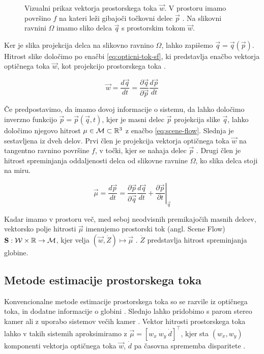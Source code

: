 \begin{figure}
\centering

\caption[Vizualni prikaz vektorja prostorskega toka $\vec{w}$]{Vizualni prikaz vektorja prostorskega toka $\vec{w}$. V prostoru imamo površino $f$ na kateri leži gibajoči točkovni delec $\vec{p}$ \cite{vedula1999three}. Na slikovni ravnini $\mathit{\Omega}$ imamo sliko delca $\vec{q}$ s prostorskim tokom $\vec{w}$.}
\label{fig:scene-flow}
\end{figure}



Ker je slika projekcija delca na slikovno ravnino $\mathit{\Omega}$, lahko zapišemo $\vec{q} = \vec{q}(\vec{p})$. Hitrost slike določimo po enačbi \eqref{eq:opticni-tok-sf}, ki predstavlja enačbo vektorja optičnega toka $\vec{w}$, kot projekcijo prostorskega toka \cite{vedula1999three}. 


\begin{equation}\label{eq:opticni-tok-sf}
	\vec{w} = \frac{d\vec{q}}{dt} = \frac{\partial \vec{q}}{\partial \vec{p}}\frac{d\vec{p}}{dt}
\end{equation}

Če predpostavimo, da imamo dovoj informacije o sistemu, da lahko določimo inverzno funkcijo $\vec{p} = \vec{p}(\vec{q},t)$, kjer je masni delec $\vec{p}$ projekcija slike $\vec{q}$, lahko določimo njegovo hitrost $\mathbf{\mu} \in \mathcal{M} \subset \mathbb{R}^3$ z enačbo \eqref{eq:scene-flow}. Slednja je sestavljena iz dveh delov. Prvi člen je projekcija vektorja optičnega toka $\vec{w}$ na tangentno ravnino površine $f$, v točki, kjer se nahaja delec $\vec{p}$ \cite{vedula1999three}. Drugi člen je hitrost spreminjanja oddaljenosti delca od slikovne ravnine $\mathit{\Omega}$, ko slika delca stoji na miru. 

\begin{equation}\label{eq:scene-flow}
	\vec{\mu} = \frac{d\vec{p}}{dt} = \frac{\partial \vec{p}}{\partial \vec{q}} \frac{d\vec{q}}{dt} + \left.\frac{\partial \vec{p}}{\partial t}\right|_\vec{q}
\end{equation}

Kadar imamo v prostoru več, med seboj neodvisnih premikajočih masnih delcev, vektorsko polje hitrosti $\vec{\mu}$ imenujemo prostorski tok (angl. Scene Flow) $\mathbf{S}: \mathcal{W} \times \mathbb{R} \to \mathcal{M}$, kjer velja $(\vec{w}, \dot{Z}) \mapsto \vec{\mu}$ \cite{yan2016scene}. $\dot{Z}$ predstavlja hitrost spreminjanja globine.

\subsection{Metode estimacije prostorskega toka}
Konvencionalne metode estimacije prostorskega toka so se razvile iz optičnega toka, in dodatne informacije o globini \cite{yan2016scene}. Slednjo lahko pridobimo s parom stereo kamer ali z uporabo sistemov večih kamer \cite{jaimez2015primal}. Vektor hitrosti prostorskega toka lahko v takih sistemih aproksimiramo z $\vec{\mu} = \left[w_x~w_y~\dot{d}\right]^\top$, kjer sta $(w_x, w_y)$ komponenti vektorja optičnega toka $\vec{w}$, $\dot{d}$ pa časovna sprememba disparitete \cite{yan2016scene}.

